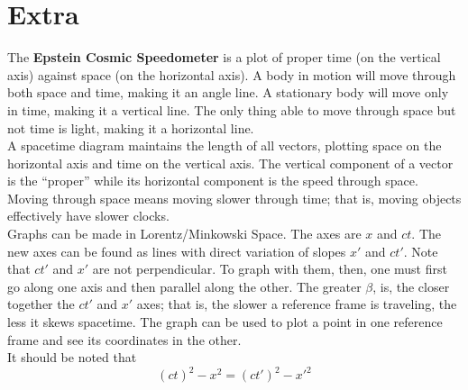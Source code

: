 \documentclass{subfiles}
\begin{document}
	\section{Extra}
		The \textbf{Epstein Cosmic Speedometer} is a plot of proper time (on the vertical axis) against space (on the horizontal axis). A body in motion will move through both space and time, making it an angle line. A stationary body will move only in time, making it  a vertical line. The only thing able to move through space but not time is light, making it a horizontal line. \\
		A spacetime diagram maintains the length of all vectors, plotting space on the horizontal axis and time on the vertical axis. The vertical component of a vector is the \enquote{proper} while its horizontal component is the speed through space. \\
		Moving through space means moving slower through time; that is, moving objects effectively have slower clocks. \\
		Graphs can be made in Lorentz/Minkowski Space. The axes are \(x\) and \(ct\). The new axes can be found as lines with direct variation of slopes \(x'\) and \(ct'\). Note that \(ct'\) and \(x'\) are not perpendicular. To graph with them, then, one must first go along one axis and then parallel along the other. The greater \(\beta\), is, the closer together the \(ct'\) and \(x'\) axes; that is, the slower a reference frame is traveling, the less it skews spacetime. The graph can be used to plot a point in one reference frame and see its coordinates in the other. \\
		It should be noted that
			\[(ct)^2 - x^2 = (ct')^2 - x'^2 \tag{invariant}\]
\end{document}
